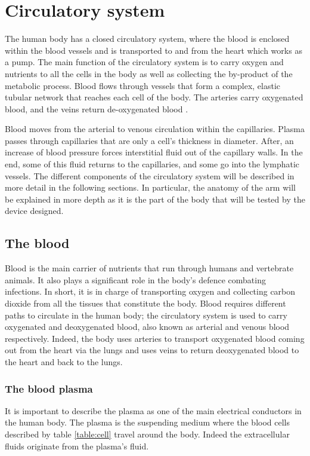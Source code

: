 \section{Circulatory system} %
\label{section literature circulatory system}
The human body has a closed circulatory system, where the blood is enclosed within the blood vessels and is transported to and from the heart which works as a pump. The main function of the circulatory system is to carry oxygen and nutrients to all the cells in the body as well as collecting the by-product of the metabolic process. Blood flows through vessels that form a complex, elastic tubular network that reaches each cell of the body. The arteries carry oxygenated blood, and the veins return de-oxygenated blood \cite{nichols2011mcdonald}. 

Blood moves from the arterial to venous circulation within the capillaries. Plasma passes through capillaries that are only a cell's thickness in diameter. After, an increase of blood pressure forces interstitial fluid out of the capillary walls. In the end, some of this fluid returns to the capillaries, and some go into the lymphatic vessels. The different components of the circulatory system will be described in more detail in the following sections. In particular, the anatomy of the arm will be explained in more depth as it is the part of the body that will be tested by the device designed.

\subsection{The blood}
\label{section literature blood}
Blood is the main carrier of nutrients that run through humans and vertebrate animals. It also plays a significant role in the body's defence combating infections. In short, it is in charge of transporting oxygen and collecting carbon dioxide from all the tissues that constitute the body. Blood requires different paths to circulate in the human body; the circulatory system is used to carry oxygenated and deoxygenated blood, also known as arterial and venous blood respectively. Indeed, the body uses arteries to transport oxygenated blood coming out from the heart via the lungs and uses veins to return deoxygenated blood to the heart and back to the lungs.

\subsubsection{The blood plasma}
It is important to describe the plasma as one of the main electrical conductors in the human body. The plasma is the suspending medium where the blood cells described by table \ref{table:cell} travel around the body. Indeed the extracellular fluids originate from the plasma's fluid.

